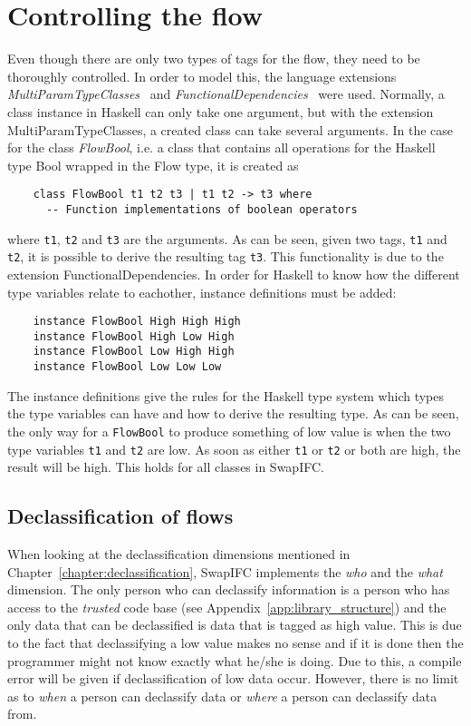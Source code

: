 \section{Controlling the flow}
Even though there are only two types of tags for the flow, they need to be thoroughly controlled. In order to model this, the language extensions \emph{MultiParamTypeClasses}~\cite{haskell-multiparamtypeclasses} and \emph{FunctionalDependencies}~\cite{haskell-functionaldependencies} were used. Normally, a class instance in Haskell can only take one argument, but with the extension MultiParamTypeClasses, a created class can take several arguments. In the case for the class \emph{FlowBool}, i.e. a class that contains all operations for the Haskell type Bool wrapped in the Flow type, it is created as
\begin{verbatim}
    class FlowBool t1 t2 t3 | t1 t2 -> t3 where
      -- Function implementations of boolean operators
\end{verbatim}
where {\tt t1}, {\tt t2} and {\tt t3} are the arguments. As can be seen, given two tags, {\tt t1} and {\tt t2}, it is possible to derive the resulting tag {\tt t3}. This functionality is due to the extension FunctionalDependencies. In order for Haskell to know how the different type variables relate to eachother, instance definitions must be added:
\begin{verbatim}
    instance FlowBool High High High
    instance FlowBool High Low High
    instance FlowBool Low High High
    instance FlowBool Low Low Low
\end{verbatim}
The instance definitions give the rules for the Haskell type system which types the type variables can have and how to derive the resulting type. As can be seen, the only way for a {\tt FlowBool} to produce something of low value is when the two type variables {\tt t1} and {\tt t2} are low. As soon as either {\tt t1} or {\tt t2} or both are high, the result will be high. This holds for all classes in SwapIFC.

\subsection{Declassification of flows}
When looking at the declassification dimensions mentioned in Chapter~\ref{chapter:declassification}, SwapIFC implements the \emph{who} and the \emph{what} dimension. The only person who can declassify information is a person who has access to the \emph{trusted} code base (see Appendix~\ref{app:library_structure}) and the only data that can be declassified is data that is tagged as high value. This is due to the fact that declassifying a low value makes no sense and if it is done then the programmer might not know exactly what he/she is doing. Due to this, a compile error will be given if declassification of low data occur. However, there is no limit as to \emph{when} a person can declassify data or \emph{where} a person can declassify data from.


